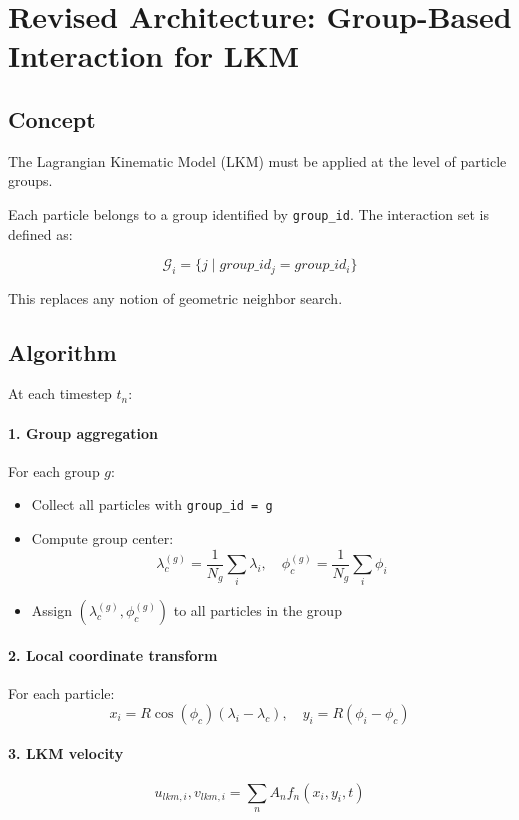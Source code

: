 \documentclass[11pt,a4paper]{article}
\begin{document}
	\section{Revised Architecture: Group-Based Interaction for LKM}
	
	\subsection{Concept}
	
	The Lagrangian Kinematic Model (LKM) must be applied at the level of particle groups.
	
	Each particle belongs to a group identified by \texttt{group\_id}. The interaction set is defined as:
	
	\[
	\mathcal G_i = \{j \;|\; group\_id_j = group\_id_i\}
	\]
	
	This replaces any notion of geometric neighbor search.
	
	\subsection{Algorithm}
	
	At each timestep $t_n$:
	
	\paragraph{1. Group aggregation}
	For each group $g$:
	\begin{itemize}
		\item Collect all particles with \texttt{group\_id = g}
		\item Compute group center:
		\[
		\lambda_c^{(g)} = \frac{1}{N_g}\sum_i \lambda_i, \quad
		\phi_c^{(g)} = \frac{1}{N_g}\sum_i \phi_i
		\]
		\item Assign $(\lambda_c^{(g)}, \phi_c^{(g)})$ to all particles in the group
	\end{itemize}
	
	\paragraph{2. Local coordinate transform}
	For each particle:
	\[
	x_i = R \cos(\phi_c)(\lambda_i - \lambda_c), \quad
	y_i = R (\phi_i - \phi_c)
	\]
	
	\paragraph{3. LKM velocity}
	\[
	u_{lkm,i}, v_{lkm,i} = \sum_n A_n f_n(x_i, y_i, t)
	\]
	
\end{document}
